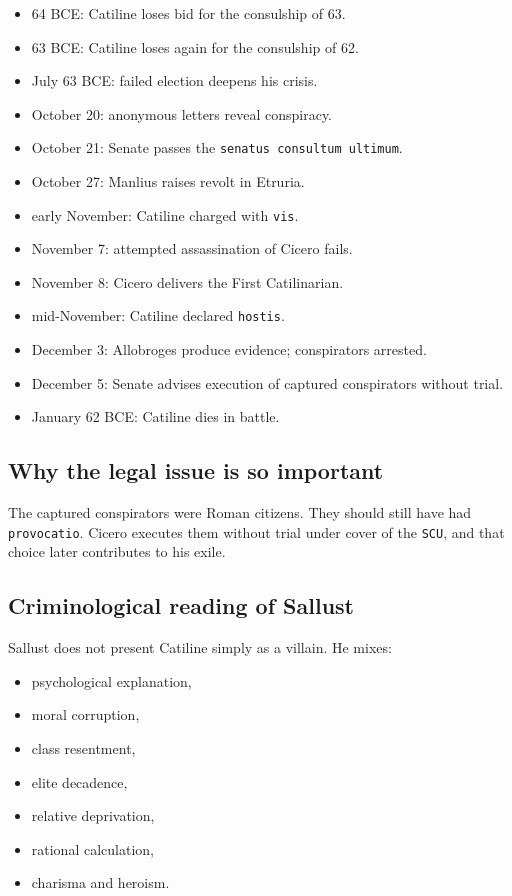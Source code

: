 \documentclass[11pt]{article}
\begin{document}
\begin{itemize}
\item 64 BCE: Catiline loses bid for the consulship of 63.
\item 63 BCE: Catiline loses again for the consulship of 62.
\item July 63 BCE: failed election deepens his crisis.
\item October 20: anonymous letters reveal conspiracy.
\item October 21: Senate passes the \texttt{senatus consultum ultimum}.
\item October 27: Manlius raises revolt in Etruria.
\item early November: Catiline charged with \texttt{vis}.
\item November 7: attempted assassination of Cicero fails.
\item November 8: Cicero delivers the First Catilinarian.
\item mid-November: Catiline declared \texttt{hostis}.
\item December 3: Allobroges produce evidence; conspirators arrested.
\item December 5: Senate advises execution of captured conspirators without trial.
\item January 62 BCE: Catiline dies in battle.
\end{itemize}

\subsection{Why the legal issue is so important}

The captured conspirators were Roman citizens. They should still have had \texttt{provocatio}. Cicero executes them without trial under cover of the \texttt{SCU}, and that choice later contributes to his exile.

\subsection{Criminological reading of Sallust}

Sallust does not present Catiline simply as a villain. He mixes:

\begin{itemize}
\item psychological explanation,
\item moral corruption,
\item class resentment,
\item elite decadence,
\item relative deprivation,
\item rational calculation,
\item charisma and heroism.
\end{itemize}
\end{document}

